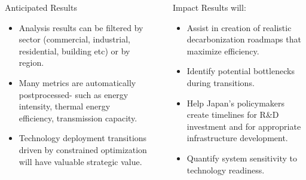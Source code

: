 \documentclass[final]{beamer}
\newlength{\sepwid}
\newlength{\onecolwid}
\newlength{\threecolwid}
\begin{document}
\begin{frame}[t]
\begin{columns}[t,totalwidth=\threecolwid]
\begin{column}{\onecolwid}
\begin{block}{Anticipated Results}

 \begin{itemize}
   \item Analysis results can be filtered by sector (commercial, industrial, residential, building etc) or by region.
   
   \item Many metrics are automatically postprocessed- such as energy intensity, thermal energy efficiency, transmission capacity. 
   
   \item Technology deployment transitions driven by constrained optimization will have valuable strategic value.    
 
 
 \end{itemize}  
 
 	
\end{block}




\end{column} %

\begin{column}{\sepwid}\end{column} %




\begin{column}{\onecolwid} %





        \begin{alertblock}{Impact}
        \large Results will:
	\begin{itemize}
		\item {\large Assist in creation of realistic decarbonization roadmaps that maximize efficiency.}
        \item {\large Identify potential bottlenecks during transitions.}
		\item {\large Help Japan's policymakers create timelines for R\&D investment and for appropriate infrastructure development.}
		\item {\large Quantify system sensitivity to technology readiness.}
	\end{itemize}
        \end{alertblock}
   


\end{column}
\end{columns}
\end{frame}
\end{document}
